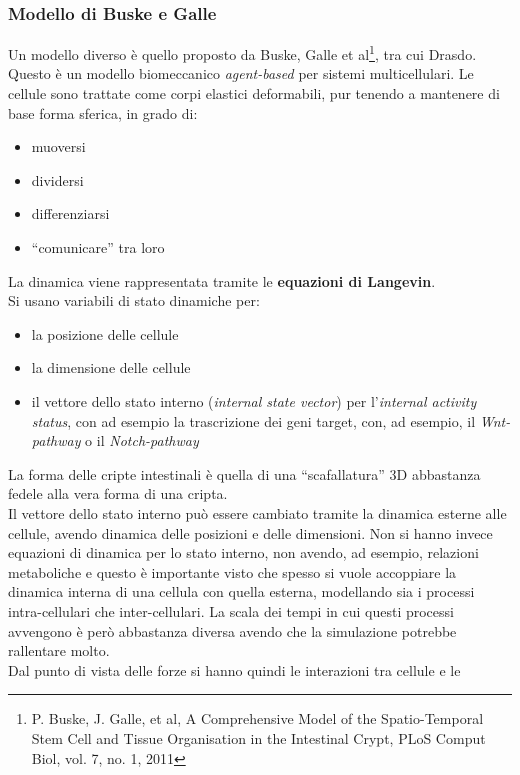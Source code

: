 \documentclass[a4paper,12pt, oneside]{book}
\begin{document}
\subsubsection{Modello di Buske e Galle}
Un modello diverso è quello proposto da Buske, Galle et al\footnote{P. Buske,
  J. Galle, et al, A Comprehensive Model of the 
Spatio-Temporal Stem Cell and Tissue Organisation in the Intestinal
Crypt, PLoS Comput Biol, vol. 7, no. 1, 2011}, tra cui Drasdo. \\
Questo è un modello biomeccanico \textit{agent-based} per sistemi
multicellulari. Le cellule sono trattate come corpi elastici deformabili, pur
tenendo a mantenere di base forma sferica, in grado di:
\begin{itemize}
  \item muoversi
  \item dividersi
  \item differenziarsi
  \item ``comunicare'' tra loro
\end{itemize}
La dinamica viene rappresentata tramite le \textbf{equazioni di Langevin}.\\
Si usano variabili di stato dinamiche per:
\begin{itemize}
  \item la posizione delle cellule
  \item la dimensione delle cellule
  \item il vettore dello stato interno (\textit{internal state vector}) per
  l'\textit{internal activity status}, con ad esempio la trascrizione dei geni
  target, con, ad esempio, il \textit{Wnt-pathway} o il \textit{Notch-pathway}
\end{itemize}
La forma delle cripte intestinali è quella di una ``scafallatura'' 3D abbastanza
fedele alla vera forma di una cripta.\\
Il vettore dello stato interno può essere cambiato tramite la dinamica esterne
alle cellule, avendo dinamica delle posizioni e delle dimensioni. Non si hanno
invece equazioni di dinamica per lo stato interno, non avendo, ad esempio,
relazioni metaboliche e questo è importante visto che spesso si vuole accoppiare
la dinamica interna di una cellula con quella esterna, modellando sia i processi
intra-cellulari che inter-cellulari. La scala dei tempi in cui questi processi
avvengono è però abbastanza diversa avendo che la simulazione potrebbe
rallentare molto.\\
Dal punto di vista delle forze si hanno quindi le interazioni tra cellule e le
\end{document}
